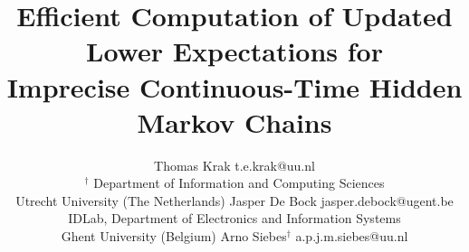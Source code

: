 \documentclass[twoside,11pt]{article}
\begin{document}


\title{Efficient Computation of Updated Lower Expectations for\\ Imprecise Continuous-Time Hidden Markov Chains}
\author{\name Thomas Krak \email t.e.krak@uu.nl\\
\addr $^\dagger$ Department of Information and Computing Sciences\\
Utrecht University (The Netherlands)
\AND
\name Jasper De Bock \email jasper.debock@ugent.be\\
\addr IDLab, Department of Electronics and Information Systems\\
Ghent University (Belgium)
\AND
\name Arno Siebes$^\dagger$ \email a.p.j.m.siebes@uu.nl
}
\maketitle
\vspace{-7pt}
\end{document}
